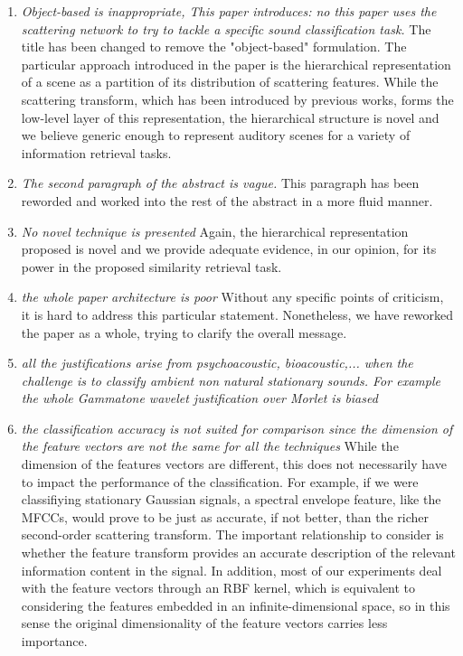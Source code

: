 \documentclass[10pt]{article}
\begin{document}
\begin{enumerate}

\item \emph{Object-based is inappropriate, This paper introduces: no this paper uses the scattering network to try to tackle a specific sound classification task.}
The title has been changed to remove the "object-based" formulation. The particular approach introduced in the paper is the hierarchical representation of a scene as a partition of its distribution of scattering features. While the scattering transform, which has been introduced by previous works, forms the low-level layer of this representation, the hierarchical structure is novel and we believe generic enough to represent auditory scenes for a variety of information retrieval tasks.

\item \emph{The second paragraph of the abstract is vague.}
This paragraph has been reworded and worked into the rest of the abstract in a more fluid manner.

\item \emph{No novel technique is presented}
Again, the hierarchical representation proposed is novel and we provide adequate evidence, in our opinion, for its power in the proposed similarity retrieval task.

\item \emph{the whole paper architecture is poor}
Without any specific points of criticism, it is hard to address this particular statement. Nonetheless, we have reworked the paper as a whole, trying to clarify the overall message.

\item \emph{all the justifications arise from psychoacoustic, bioacoustic,... when the challenge is to classify ambient non natural stationary sounds. For example the whole Gammatone wavelet justification over Morlet is biased}

\item \emph{the classification accuracy is not suited for comparison since the dimension of the feature vectors are not the same for all the techniques }
While the dimension of the features vectors are different, this does not necessarily have to impact the performance of the classification. For example, if we were classifiying stationary Gaussian signals, a spectral envelope feature, like the MFCCs, would prove to be just as accurate, if not better, than the richer second-order scattering transform. The important relationship to consider is whether the feature transform provides an accurate description of the relevant information content in the signal. In addition, most of our experiments deal with the feature vectors through an RBF kernel, which is equivalent to considering the features embedded in an infinite-dimensional space, so in this sense the original dimensionality of the feature vectors carries less importance.


\end{enumerate}
\end{document}
